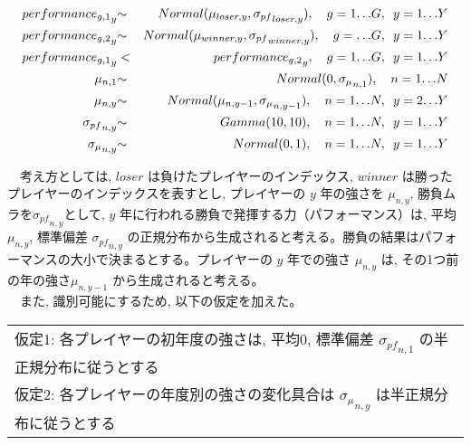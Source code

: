 \documentclass[uplatex,9pt,a5j]{jsarticle}
\begin{document}
\begin{eqnarray}
  {performance_{g,1}}_y & {\sim} & Normal(\mu_{loser,y},{\sigma_{pf}}_{loser,y}), \hspace{1em} g=1{\ldots}G, \hspace{0.5em} y=1{\ldots}Y \nonumber \\
  {performance_{g,2}}_y & {\sim} & Normal(\mu_{winner,y},{\sigma_{pf}}_{winner,y}), \hspace{1em} g={\ldots}G, \hspace{0.5em} y=1{\ldots}Y \nonumber \\
  {performance_{g,1}}_y & < & {performance_{g,2}}_y, \hspace{1em} g=1{\ldots}G, \hspace{0.5em} y=1{\ldots}Y \nonumber \\
  \mu_{n,1} & {\sim} & Normal(0,{\sigma_\mu}_{n,1}), \hspace{1em} n=1{\ldots}N \\
  \mu_{n,y} & {\sim} & Normal(\mu_{n,y-1},{\sigma_\mu}_{n,y-1}), \hspace{1em} n=1{\ldots}N,\hspace{0.5em} y=2{\ldots}Y \nonumber \\
  {\sigma_{pf}}_{n,y} & {\sim} & Gamma(10,10), \hspace{1em} n=1{\ldots}N,\hspace{0.5em} y=1{\ldots}Y \nonumber \\
  {\sigma_{\mu}}_{n,y} & {\sim} & Normal(0,1), \hspace{1em} n=1{\ldots}N,\hspace{0.5em} y=1{\ldots}Y \nonumber
  \label{eq:eq_strength_ts}
\end{eqnarray}

　考え方としては, $loser$ は負けたプレイヤーのインデックス, $winner$ は勝ったプレイヤーのインデックスを表すとし, プレイヤーの $y$ 年の強さを $\mu_{n,y}$, 勝負ムラを${\sigma_{pf}}_{n,y}$として, $y$ 年に行われる勝負で発揮する力（パフォーマンス）は, 平均$\mu_{n,y}$, 標準偏差 ${\sigma_{pf}}_{n,y}$ の正規分布から生成されると考える。勝負の結果はパフォーマンスの大小で決まるとする。プレイヤーの $y$ 年での強さ $\mu_{n,y}$ は, その1つ前の年の強さ$\mu_{n,y-1}$ から生成されると考える。\\
　また, 識別可能にするため, 以下の仮定を加えた。

\begin{table}[htb]
  \begin{tabular}{l}
    仮定1: 各プレイヤーの初年度の強さは, 平均0, 標準偏差 ${\sigma_{pf}}_{n,1}$ の半正規分布に従うとする \\
    仮定2: 各プレイヤーの年度別の強さの変化具合は ${\sigma_{\mu}}_{n,y}$ は半正規分布に従うとする
  \end{tabular}
\end{table}
\end{document}
